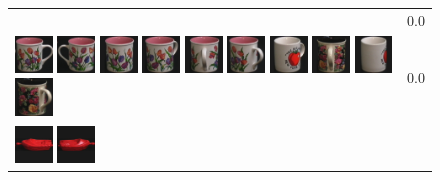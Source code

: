 \begin{figure}[tbp]
\begin{tabular}{m{11cm} | m{3cm} |}
& {\scriptsize 0.0}
\\
\includegraphics[width=1cm]{coil/beeld-6.eps}
\includegraphics[width=1cm]{coil/beeld-7.eps}
\includegraphics[width=1cm]{coil/beeld-8.eps}
\includegraphics[width=1cm]{coil/beeld-9.eps}
\includegraphics[width=1cm]{coil/beeld-11.eps}
\includegraphics[width=1cm]{coil/beeld-10.eps}
\includegraphics[width=1cm]{coil/beeld-39.eps}
\includegraphics[width=1cm]{coil/beeld-65.eps}
\includegraphics[width=1cm]{coil/beeld-38.eps}
\includegraphics[width=1cm]{coil/beeld-64.eps}
& {\scriptsize 0.0}
\\
\includegraphics[width=1cm]{coil/beeld-18.eps}
\includegraphics[width=1cm]{coil/beeld-19.eps}

\end{tabular}
\end{figure}
